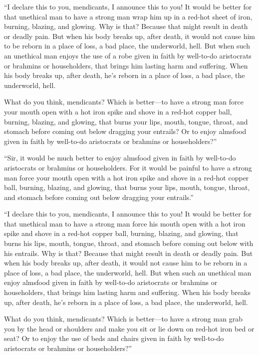 \documentclass[12pt,openany]{book}%
\begin{document}
“I declare this to you, mendicants, I announce this to you! It would be better for that unethical man to have a strong man wrap him up in a red-hot sheet of iron, burning, blazing, and glowing. Why is that? Because that might result in death or deadly pain. But when his body breaks up, after death, it would not cause him to be reborn in a place of loss, a bad place, the underworld, hell. But when such an unethical man enjoys the use of a robe given in faith by well-to-do aristocrats or brahmins or householders, that brings him lasting harm and suffering. When his body breaks up, after death, he’s reborn in a place of loss, a bad place, the underworld, hell. 

What do you think, mendicants? Which is better—to have a strong man force your mouth open with a hot iron spike and shove in a red-hot copper ball, burning, blazing, and glowing, that burns your lips, mouth, tongue, throat, and stomach before coming out below dragging your entrails? Or to enjoy almsfood given in faith by well-to-do aristocrats or brahmins or householders?” 

“Sir, it would be much better to enjoy almsfood given in faith by well-to-do aristocrats or brahmins or householders. For it would be painful to have a strong man force your mouth open with a hot iron spike and shove in a red-hot copper ball, burning, blazing, and glowing, that burns your lips, mouth, tongue, throat, and stomach before coming out below dragging your entrails.” 

“I declare this to you, mendicants, I announce this to you! It would be better for that unethical man to have a strong man force his mouth open with a hot iron spike and shove in a red-hot copper ball, burning, blazing, and glowing, that burns his lips, mouth, tongue, throat, and stomach before coming out below with his entrails. Why is that? Because that might result in death or deadly pain. But when his body breaks up, after death, it would not cause him to be reborn in a place of loss, a bad place, the underworld, hell. But when such an unethical man enjoy almsfood given in faith by well-to-do aristocrats or brahmins or householders, that brings him lasting harm and suffering. When his body breaks up, after death, he’s reborn in a place of loss, a bad place, the underworld, hell. 

What do you think, mendicants? Which is better—to have a strong man grab you by the head or shoulders and make you sit or lie down on red-hot iron bed or seat? Or to enjoy the use of beds and chairs given in faith by well-to-do aristocrats or brahmins or householders?” 
\end{document}
